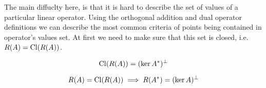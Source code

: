 The main diffuclty here, is that it is hard to describe the set of values of a
particular linear operator.
Using the orthogonal addition and dual operator definitions we can describe the
most common criteria of points being contained in operator's values set. At first we need to
make sure that this set is closed, i.e. $R(A) = \operatorname{Cl}({R(A)})$.

\begin{thm}[1]
  \[
    \operatorname{Cl}({R(A)}) = (\ker{A^*})^\perp
  \]
\end{thm}

\begin{thm}[2]
  \[
    R(A) = \operatorname{Cl}({R(A)}) \implies R(A^*) = (\ker{A})^\perp
  \]
\end{thm}